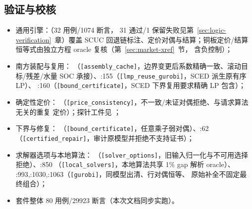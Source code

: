 \subsection{验证与校核}
\begin{itemize}
  \item 通用引擎：（32 用例/1074 断言，
        31 通过/1 保留失败见第~\ref{sec:logic-verification}~章）覆盖
        SCUC 回退链标注、定价对偶与结算；铜板定价/结算恒等式由独立方程 oracle
         复核（第~\ref{sec:market-xref}~节，
        含负控制）；
  \item 南方装配与复用：
        （\texttt{[assembly\_cache]}，边界变更后系数精确一致、滚动目标/残差/水量
        SOC 承接）、:155（\texttt{[lmp\_reuse\_gurobi]}，SCED 派生原有序 LP）、
        :160（\texttt{[bound\_certificate]}，SCED 下界复用要求精确 LP 包含）；
  \item 确定性定价：
        （\texttt{[price\_consistency]}，不一致/未证对偶拒绝、与请求算法无关的重复
        定价）；探针工件见 ；
  \item 下界与修复：
        （\texttt{[bound\_certificate]}，任意乘子弱对偶）、:62
        （\texttt{[certified\_repair]}，审计原模型并拒绝不支持证书）；
  \item 求解器选项与本地算法：
        （\texttt{[solver\_options]}，旧输入归一化与不可用选择拒绝）、:850
        （\texttt{[local\_solvers]}，本地算法共享 1\% gap 解析 oracle）、
        :993,:1030,:1063（\texttt{[gurobi]}，同模型出清、行对偶恒等、
        原始补全不固定最终组合）；
  \item 套件整体 80 用例/29923 断言（本次文档同步实跑）。
\end{itemize}

